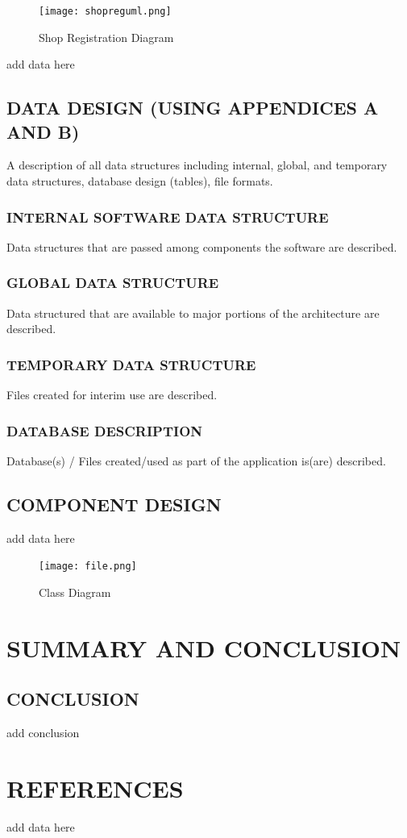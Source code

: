 \documentclass[12pt,a4paper]{report}
\begin{document}
\begin{figure}[H]
\begin{center}
\texttt{[image: shopreguml.png]}
\end{center}
\caption{Shop Registration Diagram}
\label{tab:sysarch}
\end{figure}


\newpage
add data here

\newpage
\section{DATA DESIGN (USING APPENDICES A AND B)}
A description of all data structures including internal, global, and temporary data structures, database design (tables), file formats.
\subsection{INTERNAL SOFTWARE DATA STRUCTURE}
Data structures that are passed among components the software are described. 
\subsection{GLOBAL DATA STRUCTURE}
Data structured that are available to major portions of the architecture are described.  
\subsection{TEMPORARY DATA STRUCTURE}
Files created for interim use are described.
\subsection{DATABASE DESCRIPTION}
Database(s) / Files created/used as part of the application is(are) described. 
\section{COMPONENT DESIGN}
add data here
\begin{figure}[H]
\begin{center}
\texttt{[image: file.png]}
\end{center}
\caption{Class Diagram}
\label{tab:classd}
\end{figure}

\chapter{SUMMARY AND CONCLUSION}
\section{CONCLUSION}
add conclusion

\chapter{REFERENCES}

\begin{enumerate}[ {[}1{]} ]
\item add data here
\end{enumerate}
\end{document}
